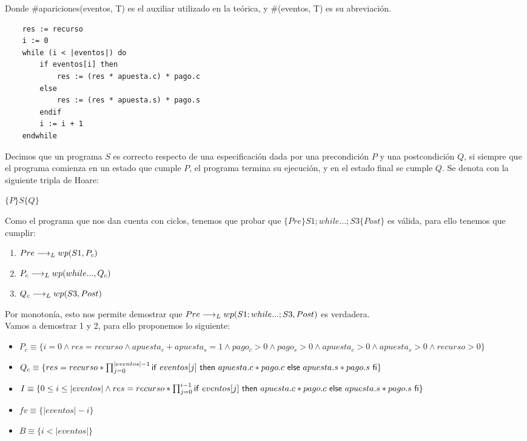 \documentclass[10pt,a4paper]{article}
\begin{document}
Donde \#apariciones(eventos, T) es el auxiliar utilizado en la teórica, y \#(eventos, T) es su abreviación.
\begin{lstlisting}
	res := recurso
	i := 0
	while (i < |eventos|) do
		if eventos[i] then
			res := (res * apuesta.c) * pago.c
		else
			res := (res * apuesta.s) * pago.s
		endif
		i := i + 1
	endwhile
	\end{lstlisting}
Decimos que un programa $S$ es correcto respecto de una especificación dada por una precondición $P$ y una postcondición $Q$, si siempre que el programa comienza en un estado que cumple $P$, el programa termina su ejecución, y en el estado final se cumple $Q$. Se denota con la siguiente tripla de Hoare: \\
\begin{center}
	$\{P\} S \{Q\}$
\end{center}
Como el programa que nos dan cuenta con ciclos, tenemos que probar que $\{Pre\}S1;while...;S3\{Post\}$ es válida, para ello tenemos que cumplir:
\begin{enumerate}
	\item $Pre \longrightarrow _L wp(S1, P_c)$
	\item $P_c \longrightarrow _L wp(while..., Q_c)$
	\item $Q_c \longrightarrow _L wp(S3, Post)$
\end{enumerate}
Por monotonía, esto nos permite demostrar que $Pre \longrightarrow _L wp(S1;while...;S3, Post)$ es verdadera. \\
Vamos a demostrar 1 y 2, para ello proponemos lo siguiente:
\begin{itemize}
	\item $P_c \equiv \{i = 0 \land res = recurso \land apuesta_c + apuesta_s = 1 \land pago_c > 0 \land pago_s > 0 \land apuesta_c > 0 \land apuesta_s > 0 \land recurso > 0\}$
	\item $Q_c \equiv \{res = recurso * \prod_{j = 0}^{|eventos| - 1} \mathsf{if}\ eventos[j]\ \mathsf{then}\ apuesta.c *pago.c\ \mathsf{else}\ apuesta.s * pago.s\ \mathsf{fi}\}$
	\item $I \equiv \{0 \leq i \leq |eventos| \land res = recurso * \prod_{j = 0}^{i - 1} \mathsf{if}\ eventos[j]\ \mathsf{then}\ apuesta.c *pago.c\ \mathsf{else}\ apuesta.s * pago.s\ \mathsf{fi}\}$
	\item $fv \equiv \{|eventos|-i \}$
	\item $B \equiv \{i < |eventos|\}$
\end{itemize}
\end{document}
